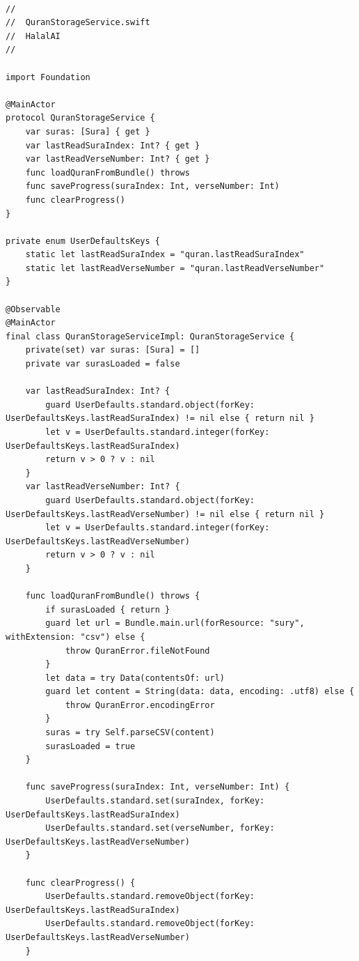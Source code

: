 \begin{lstlisting}[basicstyle=\tiny\ttfamily,breaklines=true]

//
//  QuranStorageService.swift
//  HalalAI
//

import Foundation

@MainActor
protocol QuranStorageService {
    var suras: [Sura] { get }
    var lastReadSuraIndex: Int? { get }
    var lastReadVerseNumber: Int? { get }
    func loadQuranFromBundle() throws
    func saveProgress(suraIndex: Int, verseNumber: Int)
    func clearProgress()
}

private enum UserDefaultsKeys {
    static let lastReadSuraIndex = "quran.lastReadSuraIndex"
    static let lastReadVerseNumber = "quran.lastReadVerseNumber"
}

@Observable
@MainActor
final class QuranStorageServiceImpl: QuranStorageService {
    private(set) var suras: [Sura] = []
    private var surasLoaded = false

    var lastReadSuraIndex: Int? {
        guard UserDefaults.standard.object(forKey: UserDefaultsKeys.lastReadSuraIndex) != nil else { return nil }
        let v = UserDefaults.standard.integer(forKey: UserDefaultsKeys.lastReadSuraIndex)
        return v > 0 ? v : nil
    }
    var lastReadVerseNumber: Int? {
        guard UserDefaults.standard.object(forKey: UserDefaultsKeys.lastReadVerseNumber) != nil else { return nil }
        let v = UserDefaults.standard.integer(forKey: UserDefaultsKeys.lastReadVerseNumber)
        return v > 0 ? v : nil
    }

    func loadQuranFromBundle() throws {
        if surasLoaded { return }
        guard let url = Bundle.main.url(forResource: "sury", withExtension: "csv") else {
            throw QuranError.fileNotFound
        }
        let data = try Data(contentsOf: url)
        guard let content = String(data: data, encoding: .utf8) else {
            throw QuranError.encodingError
        }
        suras = try Self.parseCSV(content)
        surasLoaded = true
    }

    func saveProgress(suraIndex: Int, verseNumber: Int) {
        UserDefaults.standard.set(suraIndex, forKey: UserDefaultsKeys.lastReadSuraIndex)
        UserDefaults.standard.set(verseNumber, forKey: UserDefaultsKeys.lastReadVerseNumber)
    }

    func clearProgress() {
        UserDefaults.standard.removeObject(forKey: UserDefaultsKeys.lastReadSuraIndex)
        UserDefaults.standard.removeObject(forKey: UserDefaultsKeys.lastReadVerseNumber)
    }


\end{lstlisting}
